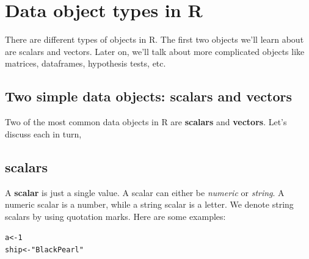 \documentclass{tufte-book}\usepackage[]{graphicx}\usepackage[]{color}
\makeatletter
\newcommand{\hlnum}[1]{\textcolor[rgb]{0.686,0.059,0.569}{#1}}%
\newcommand{\hlstr}[1]{\textcolor[rgb]{0.192,0.494,0.8}{#1}}%
\newcommand{\hlstd}[1]{\textcolor[rgb]{0.345,0.345,0.345}{#1}}%
\newcommand{\hlkwb}[1]{\textcolor[rgb]{0.69,0.353,0.396}{#1}}%
\newenvironment{kframe}{%
 \def\at@end@of@kframe{}%
 \ifinner\ifhmode%
  \def\at@end@of@kframe{\end{minipage}}%
  \begin{minipage}{\columnwidth}%
 \fi\fi%
 \def\FrameCommand##1{\hskip\@totalleftmargin \hskip-\fboxsep
 \colorbox{shadecolor}{##1}\hskip-\fboxsep
     \hskip-\linewidth \hskip-\@totalleftmargin \hskip\columnwidth}%
 \MakeFramed {\advance\hsize-\width
   \@totalleftmargin\z@ \linewidth\hsize
   \@setminipage}}%
 {\par\unskip\endMakeFramed%
 \at@end@of@kframe}
\newenvironment{knitrout}{}{} %
\makeatother
\begin{document}
\section{Data object types in R}

There are different types of objects in R. The first two objects we'll learn about are scalars and vectors. Later on, we'll talk about more complicated objects like matrices, dataframes, hypothesis tests, etc.

\subsection{Two simple data objects: scalars and vectors}

Two of the most common data objects in R are \textbf{scalars} and \textbf{vectors}. Let's discuss each in turn,

\subsection{scalars}

A \textbf{scalar} is just a single value. A scalar can either be \textit{numeric} or \textit{string}. A numeric scalar is a number, while a string scalar is a letter. We denote string scalars by using quotation marks. Here are some examples:

\begin{knitrout}
\color{fgcolor}\begin{kframe}
\begin{alltt}
\hlstd{a} \hlkwb{<-} \hlnum{1}
\hlstd{ship} \hlkwb{<-} \hlstr{"Black Pearl"}
\end{alltt}
\end{kframe}
\end{knitrout}
\end{document}
